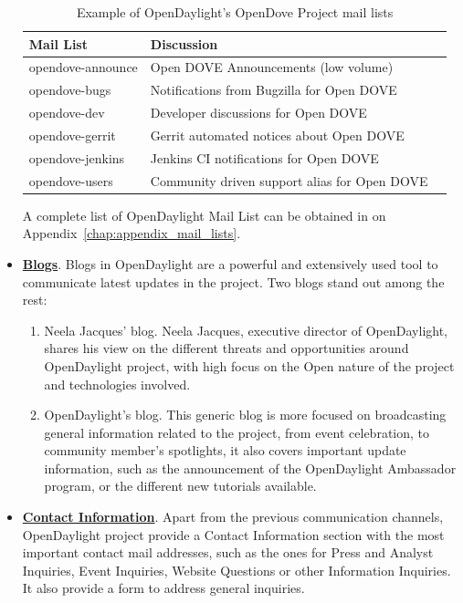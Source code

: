 \documentclass[a4paper, 12pt]{book}
\begin{document}
\begin{itemize}
\begin{table}
\footnotesize
\begin{center}
\begin{tabular}{|l|l|l|}
\hline
\textbf{Mail List} & \textbf{Discussion} \\ \hline
opendove-announce	& Open DOVE Announcements (low volume) \\ \hline
opendove-bugs	& Notifications from Bugzilla for Open DOVE \\ \hline
opendove-dev	& Developer discussions for Open DOVE \\ \hline
opendove-gerrit	& Gerrit automated notices about Open DOVE \\ \hline
opendove-jenkins	& Jenkins CI notifications for Open DOVE \\ \hline
opendove-users	& Community driven support alias for Open DOVE \\ \hline
\end{tabular}
\end{center}
\caption{Example of OpenDaylight's OpenDove Project mail lists}
\label{tab:projectmaillist}
\end{table}
A complete list of OpenDaylight Mail List can be obtained in on Appendix~\ref{chap:appendix_mail_lists}.
\item{\textbf{\underline{Blogs}}}. Blogs in OpenDaylight are a powerful and extensively used tool to communicate latest updates in the project. Two blogs stand out among the rest:
\begin{enumerate}
\item{Neela Jacques' blog}. Neela Jacques, executive director of OpenDaylight, shares his view on the different threats and opportunities around OpenDaylight project, with high focus on the Open nature of the project and technologies involved.
\item{OpenDaylight's blog}. This generic blog is more focused on broadcasting general information related to the project, from event celebration, to community member's spotlights, it also covers important update information, such as the announcement of the OpenDaylight Ambassador program, or the different new tutorials available.
\end{enumerate}
\item{\textbf{\underline{Contact Information}}}. Apart from the previous communication channels, OpenDaylight project provide a Contact Information section with the most important contact mail addresses, such as the ones for Press and Analyst Inquiries, Event Inquiries, Website Questions or other Information Inquiries. It also provide a form to address general inquiries.
\end{itemize}
\end{document}
